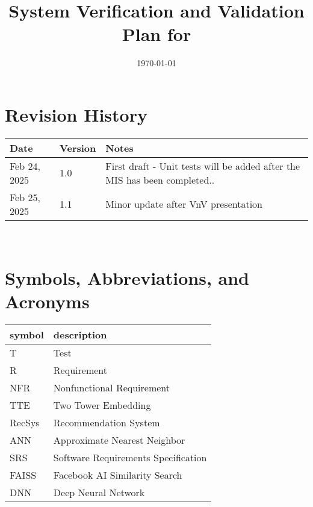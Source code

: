 \documentclass[12pt, titlepage]{article}
\begin{document}
\title{System Verification and Validation Plan for \progname{}} 
\author{\authname}
\date{\today}
	
\maketitle


\section*{Revision History}
\begin{tabularx}{\textwidth}{p{3cm}p{2cm}X}
\toprule {\bf Date} & {\bf Version} & {\bf Notes}\\
\midrule
Feb 24, 2025 & 1.0 & First draft - Unit tests will be added after the MIS has been completed..\\
Feb 25, 2025 & 1.1 & Minor update after VnV presentation\\
\bottomrule
\end{tabularx}

~\\

\newpage

\tableofcontents

\listoftables

\newpage

\section{Symbols, Abbreviations, and Acronyms}

\renewcommand{\arraystretch}{1.2}
\begin{tabular}{l l} 
  \toprule		
  \textbf{symbol} & \textbf{description}\\
  \midrule 
  T & Test\\
  R & Requirement\\
  NFR & Nonfunctional Requirement\\
  TTE & Two Tower Embedding\\
  RecSys & Recommendation System\\
  ANN & Approximate Nearest Neighbor\\
  SRS & Software Requirements Specification\\
  FAISS & Facebook AI Similarity Search\\
  DNN & Deep Neural Network\\
  \bottomrule
\end{tabular}\\
\end{document}
